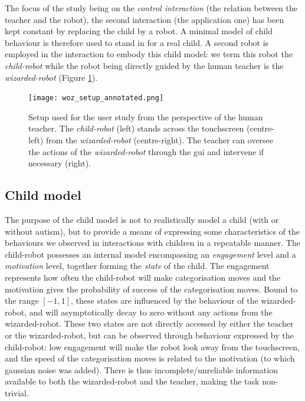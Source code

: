 The focus of the study being on the \textit{control interaction} (the relation between the teacher and the robot), the second interaction (the application one) has been kept constant by replacing the child by a robot. A minimal model of child behaviour is therefore used to stand in for a real child. A second robot is employed in the interaction to embody this child model: we term this robot the \textit{child-robot} while the robot being directly guided by the human teacher is the \textit{wizarded-robot} (Figure \ref{fig:woz_setup}).

\begin{figure}[t!]
	\centering
	\texttt{[image: woz\_setup\_annotated.png]}
	\caption{Setup used for the user study from the perspective of the human teacher. The \textit{child-robot} (left) stands across the touchscreen (centre-left) from the \textit{wizarded-robot} (centre-right). The teacher can oversee the actions of the \textit{wizarded-robot} through the \gls{gui} and intervene if necessary (right).}
	\label{fig:woz_setup}
\end{figure}
		
\subsection{Child model} \label{ssec:woz_child}

The purpose of the child model is not to realistically model a child (with or without autism), but to provide a means of expressing some characteristics of the behaviours we observed in interactions with children in a repeatable manner. The child-robot possesses an internal model encompassing an \emph{engagement} level and a \emph{motivation} level, together forming the \textit{state} of the child. The engagement represents how often the child-robot will make categorisation moves and the motivation gives the probability of success of the categorisation moves. Bound to the range $[-1, 1]$, these states are influenced by the behaviour of the wizarded-robot, and will asymptotically decay to zero without any actions from the wizarded-robot. These two states are not directly accessed by either the teacher or the wizarded-robot, but can be observed through behaviour expressed by the child-robot: low engagement will make the robot look away from the touchscreen, and the speed of the categorisation moves is related to the motivation (to which gaussian noise was added). There is thus incomplete/unreliable information available to both the wizarded-robot and the teacher, making the task non-trivial.

